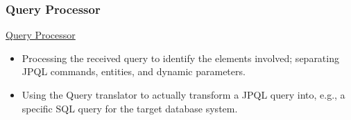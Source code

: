 \documentclass[xcolor=x11names,compress]{beamer}
\renewcommand{\(}{\begin{columns}}
\renewcommand{\)}{\end{columns}}
\newcommand{\<}[1]{\begin{column}{#1}}
\renewcommand{\>}{\end{column}}
\begin{document}
\subsubsection{Query Processor}
\begin{frame}{\underline{Query Processor}}

\begin{itemize}
\itemsep 12pt
\justifying

\item Processing the received query to identify the elements involved; separating JPQL commands, entities, and dynamic parameters.

\item Using the Query translator to actually transform a JPQL query into, e.g., a specific SQL query for the target database system.

\end{itemize}

\end{frame}

\end{document}
